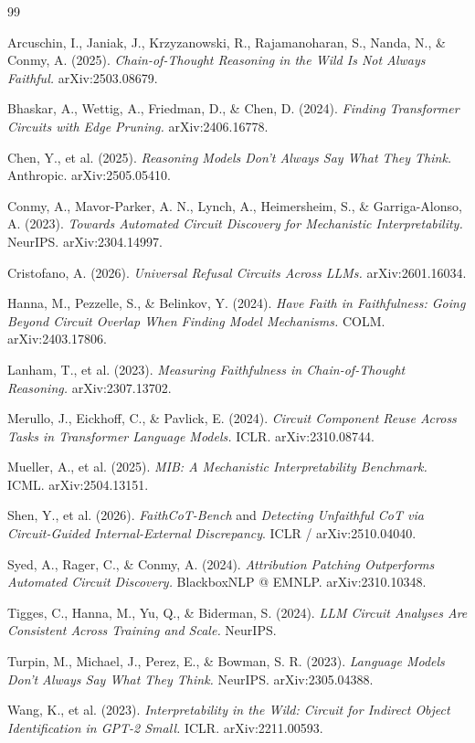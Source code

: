 \documentclass[11pt]{article}
\begin{document}

\begin{thebibliography}{99}

Arcuschin, I., Janiak, J., Krzyzanowski, R., Rajamanoharan, S., Nanda, N., \& Conmy, A. (2025). \emph{Chain-of-Thought Reasoning in the Wild Is Not Always Faithful.} arXiv:2503.08679.

Bhaskar, A., Wettig, A., Friedman, D., \& Chen, D. (2024). \emph{Finding Transformer Circuits with Edge Pruning.} arXiv:2406.16778.

Chen, Y., et al. (2025). \emph{Reasoning Models Don't Always Say What They Think.} Anthropic. arXiv:2505.05410.

Conmy, A., Mavor-Parker, A. N., Lynch, A., Heimersheim, S., \& Garriga-Alonso, A. (2023). \emph{Towards Automated Circuit Discovery for Mechanistic Interpretability.} NeurIPS. arXiv:2304.14997.

Cristofano, A. (2026). \emph{Universal Refusal Circuits Across LLMs.} arXiv:2601.16034.

Hanna, M., Pezzelle, S., \& Belinkov, Y. (2024). \emph{Have Faith in Faithfulness: Going Beyond Circuit Overlap When Finding Model Mechanisms.} COLM. arXiv:2403.17806.

Lanham, T., et al. (2023). \emph{Measuring Faithfulness in Chain-of-Thought Reasoning.} arXiv:2307.13702.

Merullo, J., Eickhoff, C., \& Pavlick, E. (2024). \emph{Circuit Component Reuse Across Tasks in Transformer Language Models.} ICLR. arXiv:2310.08744.

Mueller, A., et al. (2025). \emph{MIB: A Mechanistic Interpretability Benchmark.} ICML. arXiv:2504.13151.

Shen, Y., et al. (2026). \emph{FaithCoT-Bench} and \emph{Detecting Unfaithful CoT via Circuit-Guided Internal-External Discrepancy}. ICLR / arXiv:2510.04040.

Syed, A., Rager, C., \& Conmy, A. (2024). \emph{Attribution Patching Outperforms Automated Circuit Discovery.} BlackboxNLP @ EMNLP. arXiv:2310.10348.

Tigges, C., Hanna, M., Yu, Q., \& Biderman, S. (2024). \emph{LLM Circuit Analyses Are Consistent Across Training and Scale.} NeurIPS.

Turpin, M., Michael, J., Perez, E., \& Bowman, S. R. (2023). \emph{Language Models Don't Always Say What They Think.} NeurIPS. arXiv:2305.04388.

Wang, K., et al. (2023). \emph{Interpretability in the Wild: Circuit for Indirect Object Identification in GPT-2 Small.} ICLR. arXiv:2211.00593.

\end{thebibliography}
\end{document}

